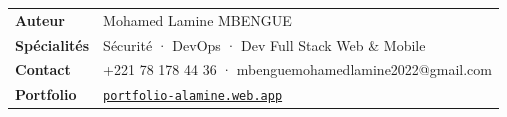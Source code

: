 \documentclass[12pt, a4paper]{article}
\begin{document}
\vspace{1cm}

\begin{tcolorbox}[colback=suva_blue!5, colframe=suva_blue!40,
  left=6pt, right=6pt, top=4pt, bottom=4pt]
\small\begin{tabular}{ll}
  \textbf{Auteur} & Mohamed Lamine MBENGUE \\
  \textbf{Spécialités} & Sécurité · DevOps · Dev Full Stack Web \& Mobile \\
  \textbf{Contact} & +221 78 178 44 36 · mbenguemohamedlamine2022@gmail.com \\
  \textbf{Portfolio} & \href{https://portfolio-alamine.web.app}{\texttt{portfolio-alamine.web.app}} \\
\end{tabular}
\end{tcolorbox}
\end{document}
